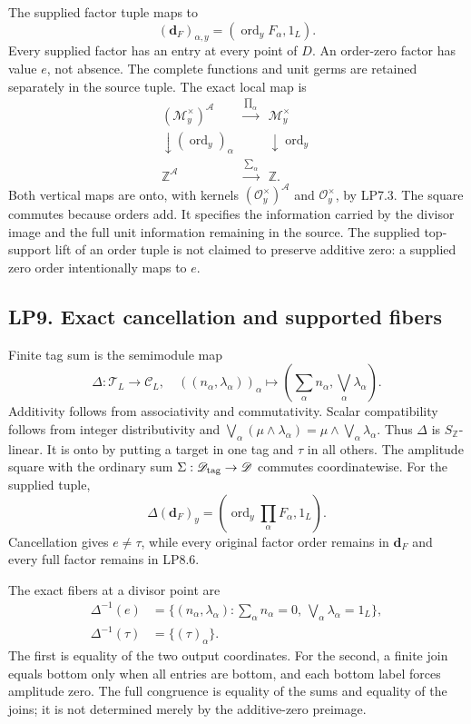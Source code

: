 The supplied factor tuple maps to \[
(\mathbf d_F)_{\alpha,y}=(\operatorname{ord}_yF_\alpha,1_L).
\tag{LP8.5}
\] Every supplied factor has an entry at every point of \(D\). An
order-zero factor has value \(e\), not absence. The complete functions
and unit germs are retained separately in the source tuple. The exact
local map is \[
\begin{array}{ccc}
(\mathcal M_y^\times)^{\mathcal A}&\xrightarrow{\prod_\alpha}&\mathcal M_y^\times\\
\downarrow(\operatorname{ord}_y)_\alpha&&\downarrow\operatorname{ord}_y\\
\mathbb Z^{\mathcal A}&\xrightarrow{\sum_\alpha}&\mathbb Z.
\end{array}\tag{LP8.6}
\] Both vertical maps are onto, with kernels
\((\mathcal O_y^\times)^{\mathcal A}\) and \(\mathcal O_y^\times\), by
LP7.3. The square commutes because orders add. It specifies the
information carried by the divisor image and the full unit information
remaining in the source. The supplied top-support lift of an order tuple
is not claimed to preserve additive zero: a supplied zero order
intentionally maps to \(e\).

\subsection{LP9. Exact cancellation and supported
fibers}\label{lp9.-exact-cancellation-and-supported-fibers}

Finite tag sum is the semimodule map \[
\Delta:\mathscr T_L\to\mathscr C_L,\quad
((n_\alpha,\lambda_\alpha))_\alpha\mapsto
\left(\sum_\alpha n_\alpha,\bigvee_\alpha\lambda_\alpha\right).
\tag{LP9.1}
\] Additivity follows from associativity and commutativity. Scalar
compatibility follows from integer distributivity and
\(\bigvee_\alpha(\mu\wedge\lambda_\alpha)=\mu\wedge\bigvee_\alpha\lambda_\alpha\).
Thus \(\Delta\) is \(S_{\mathbb Z}\)-linear. It is onto by putting a
target in one tag and \(\tau\) in all others. The amplitude square with
the ordinary sum \(\Sigma:\mathscr D_{\rm tag}\to\mathscr D\) commutes
coordinatewise. For the supplied tuple, \[
\Delta(\mathbf d_F)_y=
\left(\operatorname{ord}_y\prod_\alpha F_\alpha,1_L\right).
\tag{LP9.2}
\] Cancellation gives \(e\ne\tau\), while every original factor order
remains in \(\mathbf d_F\) and every full factor remains in LP8.6.

The exact fibers at a divisor point are \[
\begin{aligned}
\Delta^{-1}(e)&=\{(n_\alpha,\lambda_\alpha):
\sum_\alpha n_\alpha=0,\ \bigvee_\alpha\lambda_\alpha=1_L\},\\
\Delta^{-1}(\tau)&=\{(\tau)_\alpha\}.
\end{aligned}\tag{LP9.3}
\] The first is equality of the two output coordinates. For the second,
a finite join equals bottom only when all entries are bottom, and each
bottom label forces amplitude zero. The full congruence is equality of
the sums and equality of the joins; it is not determined merely by the
additive-zero preimage.

